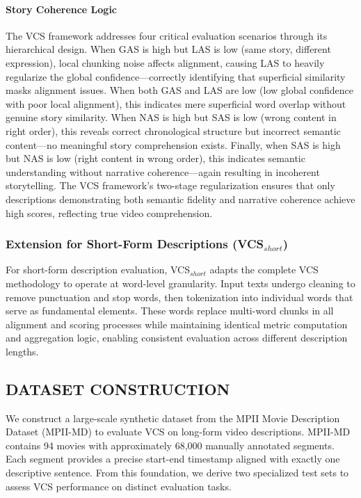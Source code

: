 \documentclass[main.tex]{subfiles}
\begin{document}
\paragraph{Story Coherence Logic}
The VCS framework addresses four critical evaluation scenarios through its hierarchical design. When GAS is high but LAS is low (same story, different expression), local chunking noise affects alignment, causing LAS to heavily regularize the global confidence—correctly identifying that superficial similarity masks alignment issues. When both GAS and LAS are low (low global confidence with poor local alignment), this indicates mere superficial word overlap without genuine story similarity. When NAS is high but SAS is low (wrong content in right order), this reveals correct chronological structure but incorrect semantic content—no meaningful story comprehension exists. Finally, when SAS is high but NAS is low (right content in wrong order), this indicates semantic understanding without narrative coherence—again resulting in incoherent storytelling. The VCS framework's two-stage regularization ensures that only descriptions demonstrating both semantic fidelity and narrative coherence achieve high scores, reflecting true video comprehension.

\subsubsection{Extension for Short-Form Descriptions (VCS$_{short}$)}
For short-form description evaluation, VCS$_{short}$ adapts the complete VCS methodology to operate at word-level granularity. Input texts undergo cleaning to remove punctuation and stop words, then tokenization into individual words that serve as fundamental elements. These words replace multi-word chunks in all alignment and scoring processes while maintaining identical metric computation and aggregation logic, enabling consistent evaluation across different description lengths.

\subsection{DATASET CONSTRUCTION}

We construct a large-scale synthetic dataset from the MPII Movie Description Dataset (MPII-MD) \cite{rohrbach2015dataset} to evaluate VCS on long-form video descriptions. MPII-MD contains 94 movies with approximately 68,000 manually annotated segments. Each segment provides a precise start-end timestamp aligned with exactly one descriptive sentence. From this foundation, we derive two specialized test sets to assess VCS performance on distinct evaluation tasks.
\end{document}

